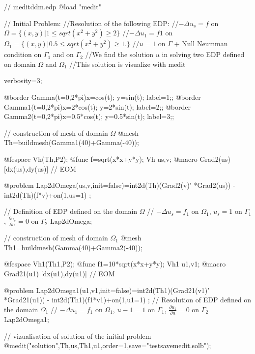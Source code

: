 \documentclass[a4paper,twoside,12pt]{book}
\begin{document}
\begin{example}
\bFF
// meditddm.edp
@load "medit"


// Initial Problem:
//Resolution of the following EDP:
//$- \Delta u_s = f$ on   $\Omega =\{ (x,y) |  1 \leq sqrt(x^2+y^2) \geq 2 \}$\hfilll
//$- \Delta u_1 = f1$ on  $\Omega_{1}=\{ (x,y) |  0.5 \leq sqrt(x^2+y^2) \geq 1. \}$\hfilll
//$u = 1$ on $\Gamma$  +  Null Neumman condition on $\Gamma_{1}$ and on $\Gamma_{2}$\hfilll
//We find the solution $u$ in solving two EDP defined on domain $\Omega$ and $\Omega_{1}$\hfilll
//This solution is visualize with medit

verbosity=3;

@border Gamma(t=0,2*pi){x=cos(t); y=sin(t); label=1;};
@border Gamma1(t=0,2*pi){x=2*cos(t); y=2*sin(t); label=2;};
@border Gamma2(t=0,2*pi){x=0.5*cos(t); y=0.5*sin(t); label=3;};

// construction of mesh of domain $\Omega$
@mesh Th=buildmesh(Gamma1(40)+Gamma(-40));

@fespace Vh(Th,P2);
@func f=sqrt(x*x+y*y);
Vh us,v;
@macro Grad2(us) [dx(us),dy(us)]  // EOM

@problem Lap2dOmega(us,v,init=false)=int2d(Th)(Grad2(v)' *Grad2(us)) 
   - int2d(Th)(f*v)+on(1,us=1) ;

//   Definition of EDP defined on the domain $\Omega$\hfilll
// $- \Delta u_s = f_1$ on $\Omega_{1}$,     $u_s = 1$ on $\Gamma_1$, $\frac{\partial u_s}{\partial n} =0 $ on $\Gamma_{2}$\hfilll
Lap2dOmega;

// construction of mesh of domain $\Omega_{1}$
@mesh Th1=buildmesh(Gamma(40)+Gamma2(-40));

@fespace Vh1(Th1,P2);
@func f1=10*sqrt(x*x+y*y);
Vh1 u1,v1;
@macro Grad21(u1) [dx(u1),dy(u1)]  // EOM

@problem Lap2dOmega1(u1,v1,init=false)=int2d(Th1)(Grad21(v1)' *Grad21(u1)) 
            - int2d(Th1)(f1*v1)+on(1,u1=1) ;
//   Resolution of EDP defined on the domain $\Omega_{1}$\hfilll
// $- \Delta u_1 = f_1$ on $\Omega_{1}$,     $u-1 = 1$ on $\Gamma_1$, $\frac{\partial u_1}{\partial n} =0 $ on $\Gamma_{2}$\hfilll
Lap2dOmega1;

// vizualisation of solution of the initial problem
@medit("solution",Th,us,Th1,u1,order=1,save="testsavemedit.solb");	
\eFF
\end{example}
\end{document}
